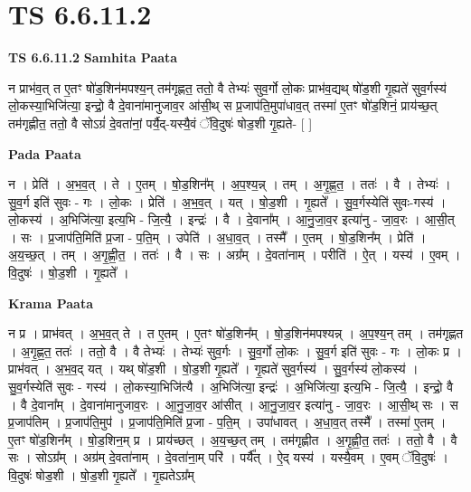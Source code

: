 \documentclass[17pt]{extarticle}
\begin{document}
\section{ TS 6.6.11.2 }

\textbf{TS 6.6.11.2 } \newline
\textbf{Samhita Paata} \newline

न प्राभ॑व॒त् त ए॒तꣳ षो॑ड॒शिन॑मपश्य॒न् तम॑गृह्णत॒ ततो॒ वै तेभ्यः॑ सुव॒र्गो लो॒कः प्राभ॑व॒द्यथ् षो॑ड॒शी गृ॒ह्यते॑ सुव॒र्गस्य॑ लो॒कस्या॒भिजि॑त्या॒ इन्द्रो॒ वै दे॒वाना॑मानुजाव॒र आ॑सी॒थ् स प्र॒जाप॑ति॒मुपा॑धाव॒त् तस्मा॑ ए॒तꣳ षो॑ड॒शिनं॒ प्राय॑च्छ॒त् तम॑गृह्णीत॒ ततो॒ वै सोऽग्रं॑ दे॒वता॑नां॒ पर्यै॒द्-यस्यै॒वं ॅवि॒दुषः॑ षोड॒शी गृ॒ह्यते- [  ] \newline

\textbf{Pada Paata} \newline

न । प्रेति॑ । अ॒भ॒व॒त् । ते । ए॒तम् । षो॒ड॒शिन᳚म् । अ॒प॒श्य॒न्न् । तम् । अ॒गृ॒ह्ण॒त॒ । ततः॑ । वै । तेभ्यः॑ । सु॒व॒र्ग इति॑ सुवः - गः । लो॒कः । प्रेति॑ । अ॒भ॒व॒त् । यत् । षो॒ड॒शी । गृ॒ह्यते᳚ । सु॒व॒र्गस्येति॑ सुवः-गस्य॑ । लो॒कस्य॑ । अ॒भिजि॑त्या॒ इत्य॒भि - जि॒त्यै॒ । इन्द्रः॑ । वै । दे॒वाना᳚म् । आ॒नु॒जा॒व॒र इत्या॑नु - जा॒व॒रः । आ॒सी॒त् । सः । प्र॒जाप॑ति॒मिति॑ प्र॒जा - प॒ति॒म् । उपेति॑ । अ॒धा॒व॒त् । तस्मै᳚ । ए॒तम् । षो॒ड॒शिन᳚म् । प्रेति॑ । अ॒य॒च्छ॒त् । तम् । अ॒गृ॒ह्णी॒त॒ । ततः॑ । वै । सः । अग्र᳚म् । दे॒वता॑नाम् । परीति॑ । ऐ॒त् । यस्य॑ । ए॒वम् । वि॒दुषः॑ । षो॒ड॒शी । गृ॒ह्यते᳚ ।  \newline


\textbf{Krama Paata} \newline

न प्र । प्राभ॑वत् । अ॒भ॒व॒त् ते । त ए॒तम् । ए॒तꣳ षो॑ड॒शिन᳚म् । षो॒ड॒शिन॑मपश्यन्न् । अ॒प॒श्य॒न् तम् । तम॑गृह्णत । अ॒गृ॒ह्ण॒त॒ ततः॑ । ततो॒ वै । वै तेभ्यः॑ । तेभ्यः॑ सुव॒र्गः । सु॒व॒र्गो लो॒कः । सु॒व॒र्ग इति॑ सुवः - गः । लो॒कः प्र । प्राभ॑वत् । अ॒भ॒व॒द् यत् । यथ् षो॑ड॒शी । षो॒ड॒शी गृ॒ह्यते᳚ । गृ॒ह्यते॑ सुव॒र्गस्य॑ । सु॒व॒र्गस्य॑ लो॒कस्य॑ । सु॒व॒र्गस्येति॑ सुवः - गस्य॑ । लो॒कस्या॒भिजि॑त्यै । अ॒भिजि॑त्या॒ इन्द्रः॑ । अ॒भिजि॑त्या॒ इत्य॒भि - जि॒त्यै॒ । इन्द्रो॒ वै । वै दे॒वाना᳚म् । दे॒वाना॑मानुजाव॒रः । आ॒नु॒जा॒व॒र आ॑सीत् । आ॒नु॒जा॒व॒र इत्या॑नु - जा॒व॒रः । आ॒सी॒थ् सः । स प्र॒जाप॑तिम् । प्र॒जाप॑ति॒मुप॑ । प्र॒जाप॑ति॒मिति॑ प्र॒जा - प॒ति॒म् । उपा॑धावत् । अ॒धा॒व॒त् तस्मै᳚ । तस्मा॑ ए॒तम् । ए॒तꣳ षो॑ड॒शिन᳚म् । षो॒ड॒शिन॒म् प्र । प्राय॑च्छत् । अ॒य॒च्छ॒त् तम् । तम॑गृह्णीत । अ॒गृ॒ह्णी॒त॒ ततः॑ । ततो॒ वै । वै सः । सोऽग्र᳚म् । अग्र॑म् दे॒वता॑नाम् । दे॒वता॑ना॒म् परि॑ । पर्यै᳚त् । ऐ॒द् यस्य॑ । यस्यै॒वम् । ए॒वम् ॅवि॒दुषः॑ । वि॒दुषः॑ षोड॒शी । षो॒ड॒शी गृ॒ह्यते᳚ । गृ॒ह्यतेऽग्र᳚म् \newline
\end{document}
